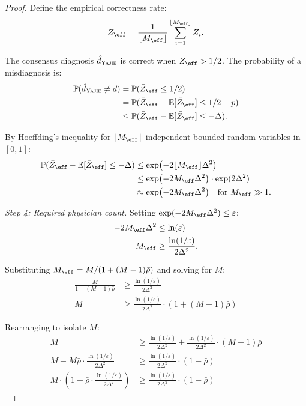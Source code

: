\documentclass[11pt,a4paper]{article}
\theoremstyle{definition}
\newcommand{\Yajie}{\textsc{Yajie}}
\newcommand{\E}{\mathbb{E}}
\newcommand{\Pbb}{\mathbb{P}}
\newcommand{\disease}{d}                       %
\newcommand{\diagnosis}{\hat{d}}               %
\begin{document}
\begin{proof}
Define the empirical correctness rate:
\begin{equation}
    \bar{Z}_{\eff} = \frac{1}{\lfloor M_{\eff} \rfloor} \sum_{i=1}^{\lfloor M_{\eff} \rfloor} Z_i.
\end{equation}

The consensus diagnosis $\diagnosis_{\Yajie}$ is correct when
$\bar{Z}_{\eff} > 1/2$. The probability of a misdiagnosis is:
\begin{align}
    \Pbb(\diagnosis_{\Yajie} \neq \disease)
    &= \Pbb(\bar{Z}_{\eff} \le 1/2) \\
    &= \Pbb(\bar{Z}_{\eff} - \E[\bar{Z}_{\eff}] \le 1/2 - p) \\
    &\le \Pbb(\bar{Z}_{\eff} - \E[\bar{Z}_{\eff}] \le -\Delta).
\end{align}

By Hoeffding's inequality for $\lfloor M_{\eff} \rfloor$ independent
bounded random variables in $[0,1]$:
\begin{align}
    \Pbb(\bar{Z}_{\eff} - \E[\bar{Z}_{\eff}] \le -\Delta)
    &\le \exp\bigl(-2 \lfloor M_{\eff} \rfloor \Delta^2\bigr) \\
    &\le \exp\bigl(-2 M_{\eff} \Delta^2\bigr) \cdot \exp(2\Delta^2) \\
    &\approx \exp\bigl(-2 M_{\eff} \Delta^2\bigr) \quad \text{for } M_{\eff} \gg 1.
\end{align}

\medskip\noindent\textit{Step 4: Required physician count.}
Setting $\exp(-2 M_{\eff} \Delta^2) \le \varepsilon$:
\begin{align}
    -2 M_{\eff} \Delta^2 &\le \ln(\varepsilon) \\
    M_{\eff} &\ge \frac{\ln(1/\varepsilon)}{2\Delta^2}.
\end{align}

Substituting $M_{\eff} = M / (1 + (M-1)\bar{\rho})$ and solving for $M$:
\begin{align}
    \frac{M}{1 + (M-1)\bar{\rho}} &\ge \frac{\ln(1/\varepsilon)}{2\Delta^2} \\
    M &\ge \frac{\ln(1/\varepsilon)}{2\Delta^2} \cdot (1 + (M-1)\bar{\rho})
\end{align}

Rearranging to isolate $M$:
\begin{align}
    M &\ge \frac{\ln(1/\varepsilon)}{2\Delta^2} + \frac{\ln(1/\varepsilon)}{2\Delta^2} \cdot (M-1)\bar{\rho} \\
    M - M\bar{\rho} \cdot \frac{\ln(1/\varepsilon)}{2\Delta^2} &\ge \frac{\ln(1/\varepsilon)}{2\Delta^2} \cdot (1 - \bar{\rho}) \\
    M \cdot \left(1 - \bar{\rho} \cdot \frac{\ln(1/\varepsilon)}{2\Delta^2}\right) &\ge \frac{\ln(1/\varepsilon)}{2\Delta^2} \cdot (1 - \bar{\rho})
\end{align}


\end{proof}
\end{document}

